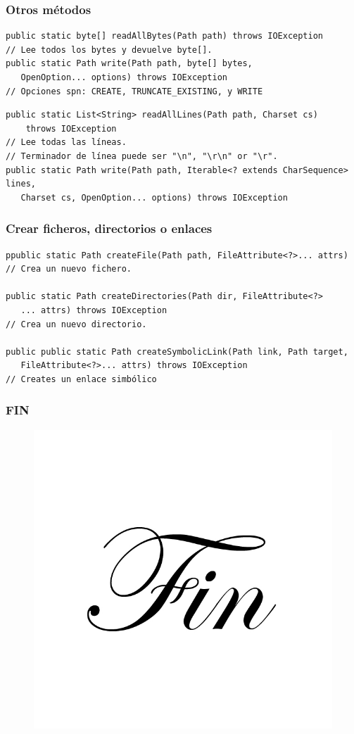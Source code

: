 \documentclass{beamer}
\begin{document}
\begin{frame}[fragile]
\frametitle{Otros métodos}
\begin{scriptsize}

\begin{verbatim}
public static byte[] readAllBytes(Path path) throws IOException
// Lee todos los bytes y devuelve byte[]. 
public static Path write(Path path, byte[] bytes,
   OpenOption... options) throws IOException
// Opciones spn: CREATE, TRUNCATE_EXISTING, y WRITE
\end{verbatim}
\pause
\begin{verbatim}
public static List<String> readAllLines(Path path, Charset cs)
    throws IOException
// Lee todas las líneas.
// Terminador de línea puede ser "\n", "\r\n" or "\r".
public static Path write(Path path, Iterable<? extends CharSequence> lines, 
   Charset cs, OpenOption... options) throws IOException
\end{verbatim}

\end{scriptsize}%
\end{frame} 	

\begin{frame}[fragile]
\frametitle{Crear ficheros, directorios o enlaces}
\begin{footnotesize}
\begin{verbatim}
ppublic static Path createFile(Path path, FileAttribute<?>... attrs)
// Crea un nuevo fichero.

public static Path createDirectories(Path dir, FileAttribute<?>
   ... attrs) throws IOException
// Crea un nuevo directorio.

public public static Path createSymbolicLink(Path link, Path target,
   FileAttribute<?>... attrs) throws IOException
// Creates un enlace simbólico
\end{verbatim}
\end{footnotesize}
\end{frame}

\begin{frame}
\frametitle{FIN}
\begin{figure}
\includegraphics[scale=0.35]{imagenes/fing.jpg}
\end{figure}
\end{frame}
\end{document}

